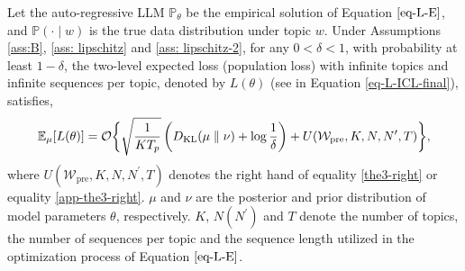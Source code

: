 \begin{theorem*} Let the auto-regressive LLM $\mathbb{P}_\theta$ be the empirical solution of Equation $\ref{eq-L-E}$, and $\mathbb{P}(\cdot\mid w)$ is the true data distribution under topic $w$. Under Assumptions \ref{ass:B}, \ref{ass: lipschitz} and \ref{ass: lipschitz-2}, for any $0<\delta < 1$, with probability at least $1-\delta$, the two-level expected loss (population loss) with infinite topics and infinite sequences per topic, denoted by $L(\theta)$ (see in Equation \ref{eq-L-ICL-final}), satisfies,
		\begin{align*}
			\mathbb{E}_{\mu}[L(\theta)]
			=\mathcal{O}\biggl\{\sqrt{\frac{1}{KT_p}}\left(D_{\mathrm{KL}}(\mu\parallel \nu)+\log \frac{1}{\delta}\right)+U(\mathcal{W}_{\text{pre}},K,N,N^\prime,T)\biggr\},
		\end{align*}
	where $U(\mathcal{W}_{\text{pre}},K,N,N^\prime,T)$ denotes the right hand of equality \ref{the3-right} or equality \ref{app-the3-right}. $\mu$ and $\nu$ are the posterior and prior distribution of model parameters $\theta$, respectively. $K$, $N (N^\prime)$ and $T$ denote the number of topics, the number of sequences per topic and the sequence length utilized in the optimization process of Equation $\ref{eq-L-E}$.
\end{theorem*}

